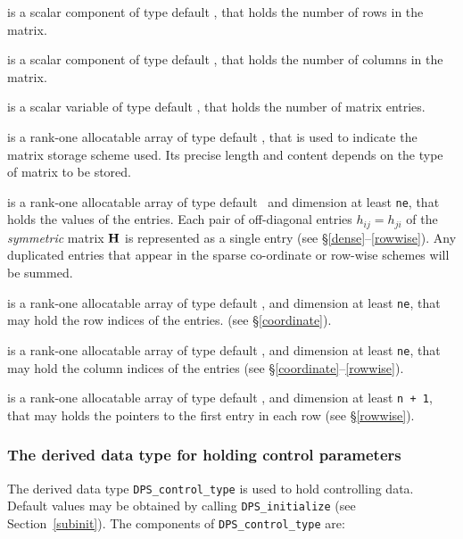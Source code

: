 \documentclass{galahad}
\newcommand{\packagename}{DPS}
\begin{document}
\begin{description}

 is a scalar component of type default \integer,
that holds the number of rows in the matrix.

 is a scalar component of type default \integer,
that holds the number of columns in the matrix.

 is a scalar variable of type default \integer, that
holds the number of matrix entries.

 is a rank-one allocatable array of type default \character, that
is used to indicate the matrix storage scheme used. Its precise length and
content depends on the type of matrix to be stored.

 is a rank-one allocatable array of type default \realdp\,
and dimension at least {\tt ne}, that holds the values of the entries.
Each pair of off-diagonal entries $h_{ij} = h_{ji}$ of the {\em symmetric}
matrix ${\mathbf{H}}$ is represented as a single entry
(see \S\ref{dense}--\ref{rowwise}).
Any duplicated entries that appear in the sparse
co-ordinate or row-wise schemes will be summed.

 is a rank-one allocatable array of type default \integer,
and dimension at least {\tt ne}, that may hold the row indices of the entries.
(see \S\ref{coordinate}).

 is a rank-one allocatable array of type default \integer,
and dimension at least {\tt ne}, that may hold the column indices of the entries
(see \S\ref{coordinate}--\ref{rowwise}).

 is a rank-one allocatable array of type default \integer,
and dimension at least {\tt n + 1}, that may holds the pointers to
the first entry in each row (see \S\ref{rowwise}).

\end{description}


\subsubsection{The derived data type for holding control
 parameters}\label{typecontrol}
The derived data type
{\tt \packagename\_control\_type}
is used to hold controlling data. Default values may be obtained by calling
{\tt \packagename\_initialize}
(see Section~\ref{subinit}). The components of
{\tt \packagename\_control\_type}
are:
\end{document}
